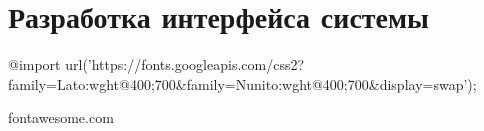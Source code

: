 \section{Разработка интерфейса системы}

@import url('https://fonts.googleapis.com/css2?family=Lato:wght@400;700&family=Nunito:wght@400;700&display=swap');

fontawesome.com







\clearpage
